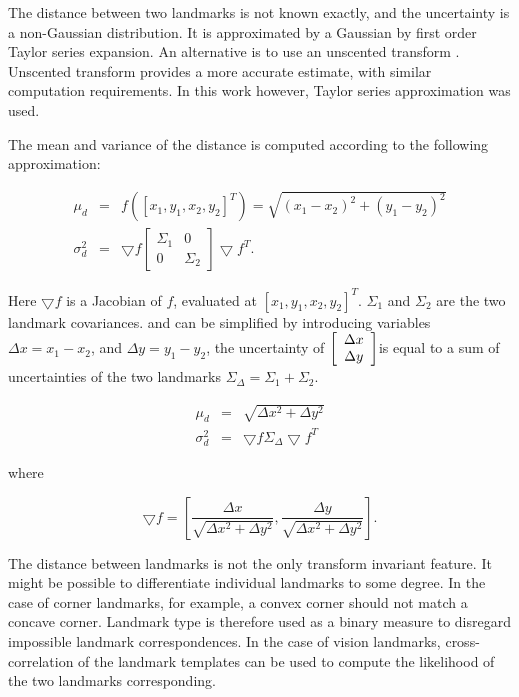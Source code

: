 The distance between two landmarks is not known exactly, and the
uncertainty is a non-Gaussian distribution. It is approximated by a
Gaussian by first order Taylor series expansion. An alternative is to
use an unscented transform \cite{unscented}. Unscented transform
provides a more accurate estimate, with similar computation
requirements. In this work however, Taylor series approximation was
used.

The mean and variance of the distance is computed according to the
following approximation:

\begin{eqnarray}
  \mu_d  &=& f([x_1,y_1,x_2,y_2]^T) = \sqrt{(x_1-x_2)^2 + (y_1-y_2)^2}
\label{eqn:dist_estimate_mu}\\
 \sigma_{d}^2 &=& \bigtriangledown f \left [\begin {array}{cc} \Sigma_1 & 0\\
 0& \Sigma_2 \end{array}\right ] \bigtriangledown f^T.
\label{eqn:dist_estimate_cov}
\end{eqnarray}

Here $\bigtriangledown f$ is a Jacobian of $f$, evaluated at
$[x_1,y_1,x_2,y_2]^T$. $\Sigma_1$ and $\Sigma_2$ are the two landmark
covariances.  and
 can be simplified by introducing
variables $\Delta x = x_1 - x_2$, and $\Delta y = y_1 - y_2$, the
uncertainty of $\left[\begin{array}{c} \Delta x\\ \Delta y \end{array} \right]$is equal to a sum of
uncertainties of the two landmarks $\Sigma_\Delta = \Sigma_1 +
\Sigma_2$.

\begin{eqnarray}
\mu_d &=& \sqrt{\Delta x^2 +\Delta y^2}\\
\sigma_d^2 &=& \bigtriangledown f \Sigma_\Delta \bigtriangledown f^T
\end{eqnarray}

where

$$ 
\bigtriangledown f = \left[
\frac{\Delta x}{\sqrt{\Delta x^2 + \Delta y^2}}, 
\frac{\Delta y}{\sqrt{\Delta x^2 + \Delta y^2}}
\right].
$$


The distance between landmarks is not the only transform invariant
feature. It might be possible to differentiate individual landmarks to
some degree. In the case of corner landmarks, for example, a convex
corner should not match a concave corner. Landmark type is therefore
used as a binary measure to disregard impossible landmark
correspondences. In the case of vision landmarks, cross-correlation of
the landmark templates can be used to compute the likelihood of the
two landmarks corresponding.

